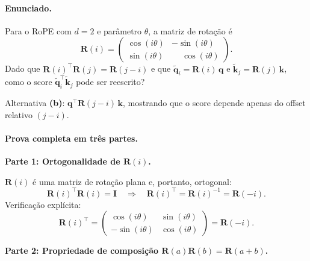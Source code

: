 \documentclass{dlproblemset}
\begin{document}
\paragraph{Enunciado.}
Para o RoPE com $d = 2$ e parâmetro $\theta$, a matriz de rotação é
\[
  \mathbf{R}(i) =
  \begin{pmatrix}
    \cos(i\theta) & -\sin(i\theta) \\
    \sin(i\theta) & \phantom{-}\cos(i\theta)
  \end{pmatrix}.
\]
Dado que $\mathbf{R}(i)^\top \mathbf{R}(j) = \mathbf{R}(j-i)$ e que $\tilde{\mathbf{q}}_i = \mathbf{R}(i)\,\mathbf{q}$
e $\tilde{\mathbf{k}}_j = \mathbf{R}(j)\,\mathbf{k}$, como o score
$\tilde{\mathbf{q}}_i^\top \tilde{\mathbf{k}}_j$ pode ser reescrito?

\begin{respostabox}
Alternativa \textbf{(b)}: $\mathbf{q}^\top \mathbf{R}(j-i)\,\mathbf{k}$, mostrando que o
score depende apenas do offset relativo $(j-i)$.
\end{respostabox}

\paragraph{Prova completa em três partes.}

\textbf{Parte 1: Ortogonalidade de $\mathbf{R}(i)$.}

$\mathbf{R}(i)$ é uma matriz de rotação plana e, portanto, ortogonal:
\[
  \mathbf{R}(i)^\top \mathbf{R}(i) = \mathbf{I} \quad \Longrightarrow \quad \mathbf{R}(i)^\top = \mathbf{R}(i)^{-1} = \mathbf{R}(-i).
\]
Verificação explícita:
\[
  \mathbf{R}(i)^\top =
  \begin{pmatrix}\cos(i\theta) & \sin(i\theta) \\ -\sin(i\theta) & \cos(i\theta)\end{pmatrix}
  = \mathbf{R}(-i).
\]

\textbf{Parte 2: Propriedade de composição $\mathbf{R}(a) \mathbf{R}(b) = \mathbf{R}(a+b)$.}
\end{document}
